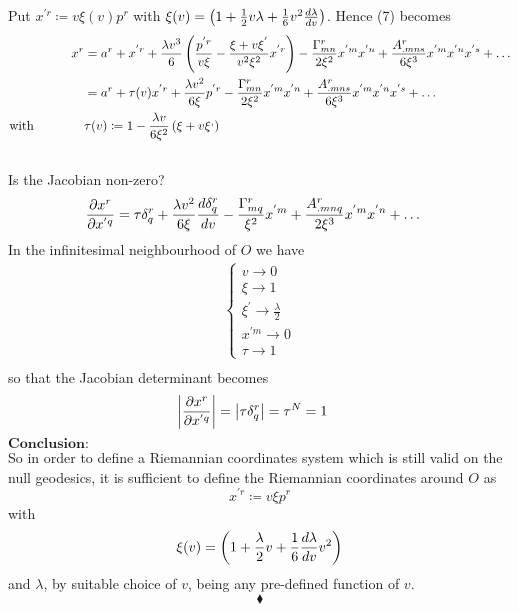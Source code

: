 Put $x^{'r} \coloneqq   v\xi(v) p^r$ with $\xi(v) = \left(1  + \frac{1}{2} v\lambda  +\frac{1}{6}v^2\dv{\lambda  }{v}\right)$. Hence (7) becomes
\begin{align}
\ x^r &= a^r + x^{'r} + \frac{\lambda v^3}{6}  \left( \frac{p^{'r}}{v\xi} - \frac{\xi + v\xi^{'}}{v^2\xi^2}x^{'r}\right)  -  \frac{\Gamma^r_{mn}}{2\xi ^2}x^{'m}x^{'n} + \frac{A^r_{.mns}}{6\xi ^3}x^{'m}x^{'n}x^{'s}+\dots\\
\ & = a^r + \tau(v) x^{'r}+ \frac{\lambda v^2 }{6\xi}p^{'r} -  \frac{\Gamma^r_{mn}}{2\xi ^2}x^{'m}x^{'n}   + \frac{A^r_{.mns}}{6\xi ^3}x^{'m}x^{'n}x^{'s}+\dots\\
\text{with}\quad\quad\quad\quad & \tau(v)  \coloneqq 1-\frac{\lambda v}{6\xi^2}\left( \xi + v\xi^{,}\right)
\end{align}\\
Is the Jacobian non-zero?
\begin{align}
\pdv{x^r}{x^{'q}}  & = \tau\delta^r_q+ \frac{\lambda  v^2}{6\xi}\dv{\delta^r_q}{v} -  \frac{\Gamma^r_{mq}}{\xi ^2}x^{'m}   + \frac{A^r_{.mnq}}{2\xi ^3}x^{'m}x^{'n}+\dots
\end{align}
In the infinitesimal neighbourhood of $O$ we have \\
\begin{align}\left \{ \begin{array}{l} 
v \rightarrow 0\\  
\xi \rightarrow 1\\
\xi^{'} \rightarrow \frac{\lambda }{2}\\ 
x^{'m} \rightarrow 0\\
\tau \rightarrow 1 
\end{array} \right.\\
\end{align}
so that the Jacobian determinant becomes
\begin{align}
\left| \pdv{x^r}{x^{'q}} \right| &= \left| \tau\delta^r_q \right| =\tau ^N = 1
\end{align}
$\textbf{Conclusion:}$\\
So in order to define a Riemannian coordinates system which is still valid on the null geodesics, it is sufficient to define the Riemannian coordinates around $O$ as $$ x^{'r} \coloneqq   v\xi p^r$$ with $$\xi(v) = \left(1  + \frac{\lambda}{2} v +\frac{1}{6}\dv{\lambda }{v} v^2\right) $$
and $\lambda $, by suitable choice of $v$, being any pre-defined function of $v$.
$$\blacklozenge$$
\newpage
